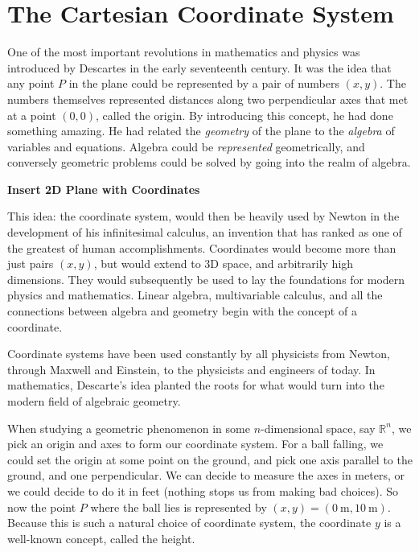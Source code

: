 \documentclass[../master.tex]{subfiles}
\begin{document}
	
	\section{The Cartesian Coordinate System} %
	\label{sec:Cartesian}
	
	
	
	One of the most important revolutions in mathematics and physics was introduced by Descartes in the early seventeenth century. It was the idea that any point $P$ in the plane could be represented by a pair of numbers $(x,y)$. The numbers themselves represented distances along two perpendicular axes that met at a point $(0,0)$, called the origin. By introducing this concept, he had done something amazing. He had related the \emph{geometry} of the plane to the \emph{algebra} of variables and equations. Algebra could be \emph{represented} geometrically, and conversely geometric problems could be solved by going into the realm of algebra. 
	
	\textbf{Insert 2D Plane with Coordinates}
	
	This idea: the coordinate system, would then be heavily used by Newton in the development of his infinitesimal calculus, an invention that has ranked as one of the greatest of human accomplishments. Coordinates would become more than just pairs $(x,y)$, but would extend to 3D space, and arbitrarily high dimensions. They would subsequently be used to lay the foundations for modern physics and mathematics. Linear algebra, multivariable calculus, and all the connections between algebra and geometry begin with the concept of a coordinate.
	
	Coordinate systems have been used constantly by all physicists from Newton, through Maxwell and Einstein, to the physicists and engineers of today. In mathematics, Descarte's idea planted the roots for what would turn into the modern field of algebraic geometry. 
	
	When studying a geometric phenomenon in some $n$-dimensional space, say $\mathbb{R}^n$, we pick an origin and axes to form our coordinate system. For a ball falling, we could set the origin at some point on the ground, and pick one axis parallel to the ground, and one perpendicular. We can decide to measure the axes in meters, or we could decide to do it in feet (nothing stops us from making bad choices). So now the point $P$ where the ball lies is represented by $(x,y)=(0~ \mathrm m,10~ \mathrm m)$. Because this is such a natural choice of coordinate system, the coordinate $y$ is a well-known concept, called the height.
	
\end{document}
